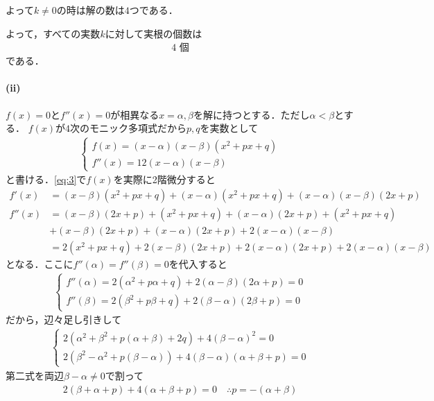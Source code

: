 \documentclass[../../main.tex]{subfiles}
\begin{document}
よって$k\neq 0$の時は解の数は$4$つである．

よって，すべての実数$k$に対して実根の個数は
\begin{align}
  4\text{ 個} \tag{答}
\end{align}
である．

\paragraph{(ii)}

$f(x)=0$と$f''(x)=0$が相異なる$x=\alpha,\beta$を解に持つとする．ただし$\alpha<\beta$とする．
$f(x)$が$4$次のモニック多項式だから$p,q$を実数として
\begin{align}
  \begin{cases}
    f(x)   = (x-\alpha)(x-\beta)(x^2+px+q) \\
    f''(x) = 12(x-\alpha)(x-\beta)
  \end{cases} \label{eq:3}
\end{align}
と書ける．\cref{eq:3}で$f(x)$を実際に2階微分すると
\begin{align}
  f'(x) &= (x-\beta)(x^2+px+q) + (x-\alpha)(x^2+px+q) + (x-\alpha)(x-\beta)(2x+p) \\
  f''(x)
  &= (x-\beta)(2x+p) + (x^2+px+q) + (x-\alpha)(2x+p) + (x^2+px+q) \\
  &+ (x-\beta)(2x+p) + (x-\alpha)(2x+p) + 2(x-\alpha)(x-\beta) \\
  &= 2(x^2+px+q) + 2(x-\beta)(2x+p) + 2(x-\alpha)(2x+p) + 2(x-\alpha)(x-\beta) \label{eq:4}
\end{align}
となる．ここに$f''(\alpha)=f''(\beta)=0$を代入すると
\begin{align}
  \begin{cases}
    f''(\alpha) = 2(\alpha^2+p\alpha+q) + 2(\alpha-\beta)(2\alpha+p) = 0 \\
    f''(\beta)  = 2(\beta^2+p\beta+q) + 2(\beta-\alpha)(2\beta+p) = 0
  \end{cases}
\end{align}
だから，辺々足し引きして
\begin{align}
  \begin{cases}
    2\left(\alpha^2+\beta^2+p(\alpha+\beta)+2q\right) + 4(\beta-\alpha)^2 = 0 \\
    2\left(\beta^2-\alpha^2+p(\beta-\alpha)\right) + 4(\beta-\alpha)(\alpha+\beta+p) = 0
  \end{cases} \label{eq:5}
\end{align}
第二式を両辺$\beta-\alpha \neq 0$で割って
\begin{align}
  2(\beta+\alpha+p) + 4(\alpha+\beta+p) = 0 \quad \therefore p = -(\alpha+\beta)\label{eq:6}
\end{align}
\end{document}
